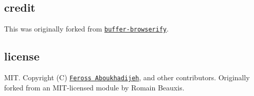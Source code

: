 \subsection*{credit}

This was originally forked from \href{https://github.com/toots/buffer-browserify}{\tt buffer-\/browserify}.

\subsection*{license}

M\+IT. Copyright (C) \href{http://feross.org}{\tt Feross Aboukhadijeh}, and other contributors. Originally forked from an M\+I\+T-\/licensed module by Romain Beauxis. 